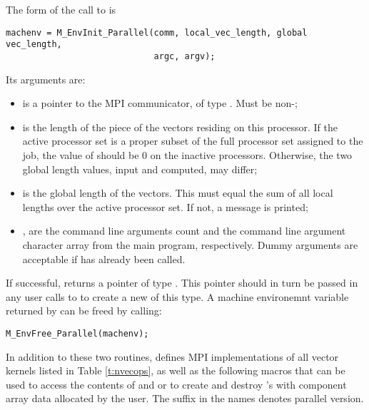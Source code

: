 \noindent The form of the call to  is
\begin{verbatim}
machenv = M_EnvInit_Parallel(comm, local_vec_length, global vec_length,
                             argc, argv);
\end{verbatim}
Its arguments are:
\begin{itemize}
\item {} is a pointer to the MPI communicator, of type .
  Must be non-;
\item {} is the length of the piece of the vectors
  residing on this processor. If the active processor set is a proper
  subset of the full processor set assigned to the job, the value of 
  should be 0 on the inactive processors. Otherwise, the two global length values,
  input and computed, may differ;
\item {} is the global length of the vectors.
  This must equal the sum of all local lengths over the active processor set.
  If not, a message is printed;
\item {},  are the command line arguments count
  and the command line argument character array from the main program,
  respectively. Dummy arguments are acceptable if  has
  already been called.
\end{itemize}
If successful,  returns a pointer of type
. This pointer should in turn be passed in any user
calls to  to create a new  of this type.
A machine environemnt variable  returned by 
can be freed by calling:
\begin{verbatim}
M_EnvFree_Parallel(machenv);
\end{verbatim}
In addition to these two routines, {\nvecp} defines MPI implementations of all 
vector kernels listed in Table \ref{t:nvecops}, as well as the following macros
that can be used to access the contents of  and 
or to create and destroy 's with component array data allocated
by the user. The suffix  in the names denotes parallel version.

